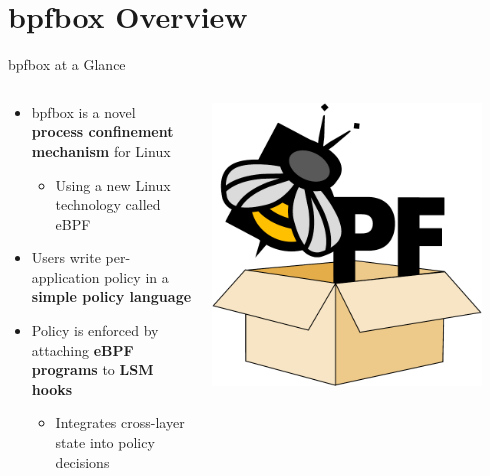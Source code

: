 \documentclass[12pt, dvipsnames, aspectratio=169]{beamer}
\begin{document}
\section{bpfbox Overview}

\begin{frame}[c]{bpfbox at a Glance}
\begin{columns}
    \begin{column}{0.6\textwidth}
        \begin{itemize}
            \item bpfbox is a novel \textbf{process confinement mechanism} for Linux%
            \begin{itemize}
                \item Using a new Linux technology called eBPF
            \end{itemize}
            \vspace{2em}
            \item Users write per-application policy in a \textbf{simple policy language}
            \vspace{2em}
            \item Policy is enforced by attaching \textbf{eBPF programs} to \textbf{LSM hooks}%
            \begin{itemize}
                \item Integrates cross-layer state into policy decisions
            \end{itemize}
        \end{itemize}
    \end{column}
    \begin{column}{0.4\textwidth}
        \begin{center}
            \color{black}
            \includegraphics[width=0.9\textwidth]{figs/bpfbox-logo.pdf}\\
        \end{center}
        \vspace{1em}
    \end{column}
\end{columns}
\end{frame}
\end{document}
